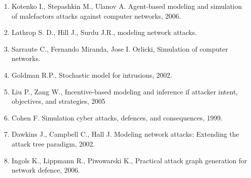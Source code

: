\begin{enumerate}
    \item  Kotenko I., Stepashkin M., Ulanov A. Agent-based modeling and simulation of malefactors attacks against computer networks, 2006.

    \item  Lathrop S. D., Hill J., Surdu J.R.,  modeling network attacks.

    \item  Sarraute C., Fernando Miranda, Jose I. Orlicki, Simulation of computer networks.

    \item  Goldman R.P., Stochastic model for intrusions, 2002.

    \item  Liu P., Zang W., Incentive-based modeling and inference if attacker intent, objectives, and strategies, 2005

    \item  Cohen F. Simulation cyber attacks, defences, and consequences, 1999.

    \item  Dawkins J., Campbell C., Hall J. Modeling network attacks: Extending the attack tree paradigm, 2002.

    \item  Ingols K., Lippmann R., Piwowarski K., Practical attack graph generation for network defence, 2006.

\end{enumerate} 